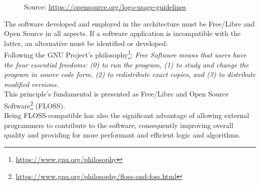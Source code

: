 \begin{figure} %
  \centering
  \def\stackalignment{r} %
  {\scriptsize \parbox[t]{\linewidth}{ Source: \url{https://opensource.org/logo-usage-guidelines}} }
\end{figure}

The software developed and employed in the architecture must be Free/Libre and Open
Source in all aspects. If a software application is incompatible with the latter,
an alternative must be identified or developed. \\ %
Following the GNU Project's philosophy\footnote{\url{https://www.gnu.org/philosophy}}:
\textit{Free Software means that users have the four essential freedoms: (0) to run
the program, (1) to study and change the program in source code form, (2) to redistribute
exact copies, and (3) to distribute modified versions.} \\ %
This principle's fundamental is presented as Free/Libre and Open Source Software\footnote{\url{https://www.gnu.org/philosophy/floss-and-foss.html}}
(FLOSS). \\ %
Being FLOSS-compatible has also the significant advantage of allowing external programmers
to contribute to the software, consequently improving overall quality and
providing for more performant and efficient logic and algorithms.

